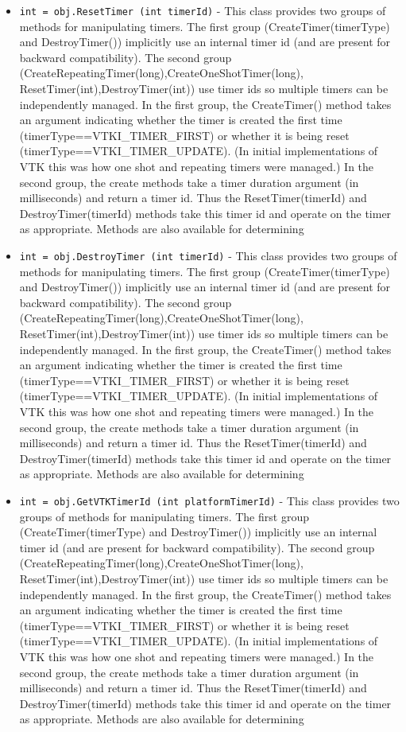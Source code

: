 \begin{itemize}
\item  \verb|int = obj.ResetTimer (int timerId)| -  This class provides two groups of methods for manipulating timers.  The
 first group (CreateTimer(timerType) and DestroyTimer()) implicitly use
 an internal timer id (and are present for backward compatibility). The
 second group (CreateRepeatingTimer(long),CreateOneShotTimer(long),
 ResetTimer(int),DestroyTimer(int)) use timer ids so multiple timers can
 be independently managed. In the first group, the CreateTimer() method
 takes an argument indicating whether the timer is created the first time
 (timerType==VTKI\_TIMER\_FIRST) or whether it is being reset
 (timerType==VTKI\_TIMER\_UPDATE). (In initial implementations of VTK this
 was how one shot and repeating timers were managed.) In the second
 group, the create methods take a timer duration argument (in
 milliseconds) and return a timer id. Thus the ResetTimer(timerId) and
 DestroyTimer(timerId) methods take this timer id and operate on the
 timer as appropriate. Methods are also available for determining

\item  \verb|int = obj.DestroyTimer (int timerId)| -  This class provides two groups of methods for manipulating timers.  The
 first group (CreateTimer(timerType) and DestroyTimer()) implicitly use
 an internal timer id (and are present for backward compatibility). The
 second group (CreateRepeatingTimer(long),CreateOneShotTimer(long),
 ResetTimer(int),DestroyTimer(int)) use timer ids so multiple timers can
 be independently managed. In the first group, the CreateTimer() method
 takes an argument indicating whether the timer is created the first time
 (timerType==VTKI\_TIMER\_FIRST) or whether it is being reset
 (timerType==VTKI\_TIMER\_UPDATE). (In initial implementations of VTK this
 was how one shot and repeating timers were managed.) In the second
 group, the create methods take a timer duration argument (in
 milliseconds) and return a timer id. Thus the ResetTimer(timerId) and
 DestroyTimer(timerId) methods take this timer id and operate on the
 timer as appropriate. Methods are also available for determining

\item  \verb|int = obj.GetVTKTimerId (int platformTimerId)| -  This class provides two groups of methods for manipulating timers.  The
 first group (CreateTimer(timerType) and DestroyTimer()) implicitly use
 an internal timer id (and are present for backward compatibility). The
 second group (CreateRepeatingTimer(long),CreateOneShotTimer(long),
 ResetTimer(int),DestroyTimer(int)) use timer ids so multiple timers can
 be independently managed. In the first group, the CreateTimer() method
 takes an argument indicating whether the timer is created the first time
 (timerType==VTKI\_TIMER\_FIRST) or whether it is being reset
 (timerType==VTKI\_TIMER\_UPDATE). (In initial implementations of VTK this
 was how one shot and repeating timers were managed.) In the second
 group, the create methods take a timer duration argument (in
 milliseconds) and return a timer id. Thus the ResetTimer(timerId) and
 DestroyTimer(timerId) methods take this timer id and operate on the
 timer as appropriate. Methods are also available for determining


\end{itemize}
